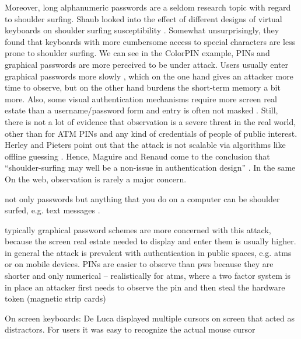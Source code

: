 Moreover, long alphanumeric passwords are a seldom research topic with regard to shoulder surfing. Shaub \etal looked into the effect of different designs of virtual keyboards on shoulder surfing susceptibility \cite{Schaub2012PasswordShoulderSurfing}. Somewhat unsurprisingly, they found that keyboards with more cumbersome access to special characters are less prone to shoulder surfing. We can see in the ColorPIN example, PINs and graphical passwords are more perceived to be under attack. Users usually enter graphical passwords more slowly \cite{Tari2006ShoulderSurfingComparison, Wiedenbeck2006ConvexHull, Renaud2009VisualSnakeOil}, which on the one hand gives an attacker more time to observe, but on the other hand burdens the short-term memory a bit more. Also, some visual authentication mechanisms require more screen real estate than a username/password form and entry is often not masked \cite{Biddle2009GraphicalFirstTwelveYears}. Still, there is not a lot of evidence that observation is a severe threat in the real world, other than for ATM PINs and any kind of credentials of people of public interest. Herley and Pieters point out that the attack is not scalable via algorithms like offline guessing \cite{Herley2015Counterfactuals}. Hence, Maguire and Renaud come to the conclusion that ``shoulder-surfing may well be a non-issue in authentication design'' \cite{Maguire2012YouOnlyLiveTwice}. 
In the same On the web, observation is rarely a major concern. 



not only passwords but anything that you do on a computer can be shoulder surfed, e.g. text messages \cite{Eiband2016MyScrawl}.


typically graphical password schemes are more concerned with this attack, because the screen real estate needed to display and enter them is usually higher.  \cite{Tari2006ShoulderSurfingComparison} 
in general the attack is prevalent with authentication in public spaces, e.g. atms or on mobile devices. \cite{DeLuca2013BackOfDevice} \cite{Roth2004PINShoulderSurfing} PINs are easier to observe than pws because they are shorter and only numerical -- realistically for atms, where a two factor system is in place an attacker first needs to observe the pin and then steal the hardware token (magnetic strip cards)

On screen keyboards: De Luca \etal displayed multiple cursors on screen that acted as distractors. For users it was easy to recognize the actual mouse cursor 
\cite{DeLuca2013FakeCursors}


